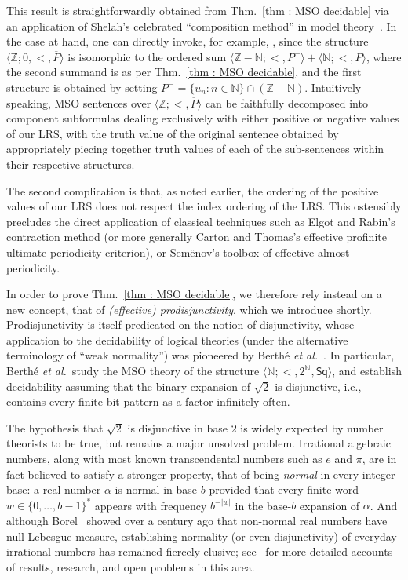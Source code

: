 \documentclass[a4paper,UKenglish,cleveref, autoref, thm-restate]{lipics-v2021}
\newcommand{\nat} {\mathbb{N}}
\begin{document}
This result is straightforwardly obtained from Thm.~\ref{thm : MSO
  decidable} via an application of Shelah's celebrated ``composition method'' in model
theory~\cite{She75}. In the case at hand, one can directly invoke, for
example, \cite[Cor.~6]{Tho97}, since the structure
$\langle \mathbb{Z} ; 0, < , \overline{P} \rangle$ is isomorphic to
the ordered sum $\langle \mathbb{Z}-\nat ; < , P^{-}\rangle +
\langle \nat ; < , P\rangle$, where the second summand is as per
Thm.~\ref{thm : MSO decidable}, and the first structure is obtained
by setting $P^{-} = \{u_n \colon n \in \nat\} \cap
(\mathbb{Z}-\nat)$. Intuitively speaking, MSO sentences over
$\langle \mathbb{Z} ; < , \overline{P} \rangle$ can be faithfully decomposed into
component subformulas dealing exclusively with either positive or
negative values of our LRS, with the truth value of the original
sentence obtained by appropriately piecing together truth values of each of
the sub-sentences within their respective structures.

The second complication is that, as noted earlier, the ordering of the positive values of
our LRS does not respect the index ordering of the LRS\@. This
ostensibly precludes the direct application of classical techniques such as
Elgot and Rabin's contraction method (or more generally Carton and
Thomas's effective profinite ultimate periodicity criterion), or Sem\"enov's
toolbox of effective almost periodicity.

In order to prove Thm.~\ref{thm : MSO decidable}, we therefore
rely instead on a new concept, that of \emph{(effective) prodisjunctivity}, which we introduce shortly. 
Prodisjunctivity is itself predicated on the notion of disjunctivity,
whose application to the decidability of logical theories
(under the alternative terminology of ``weak normality'') was
pioneered by Berth\'e
\emph{et al.}~\cite{berthe2024decidability}.
In particular,
Berth\'e \emph{et al.}\ study the MSO theory of the structure
$\langle \nat ; <, 2^\nat, \mathsf{Sq} \rangle$, and establish
decidability assuming that the binary expansion of $\sqrt{2}$ is
disjunctive, i.e., contains every finite bit pattern as a factor
infinitely often.

The hypothesis that $\sqrt{2}$ is disjunctive in base $2$ is widely
expected by number theorists to be true, but remains a major unsolved
problem. Irrational algebraic numbers, along with most known
transcendental numbers such as $e$ and $\pi$, are in fact believed to
satisfy a stronger property, that of being \emph{normal} in every
integer base: a real number $\alpha$ is normal in base $b$ provided
that every finite word $w \in \{0,\dots,b-1\}^*$ appears with
frequency $b^{-|w|}$ in the base-$b$ expansion of $\alpha$. And
although Borel~\cite{emile1909probabilites} showed over a century ago
that non-normal real numbers have null Lebesgue measure, establishing
normality (or even disjunctivity) of everyday irrational numbers has
remained fiercely elusive;
see~\cite{Har02,queffelec2006old,Kui12,Bug12} for more detailed
accounts of results, research, and open problems in this area.
\end{document}
